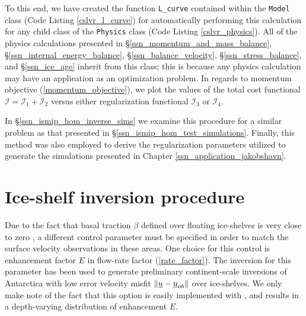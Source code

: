 To this end, we have created the function \texttt{L\_curve} contained within the \texttt{Model} class (Code Listing \ref{cslvr_l_curve}) for automatically performing this calculation for any child class of the \CSLVR \texttt{Physics} class (Code Listing \ref{cslvr_physics}).  All of the physics calculations presented in \S \ref{ssn_momentum_and_mass_balance}, \S \ref{ssn_internal_energy_balance}, \S \ref{ssn_balance_velocity}, \S \ref{ssn_stress_balance}, and \S \ref{ssn_ice_age} inherit from this class; this is because any physics calculation may have an application as an optimization problem.  In regards to momentum objective (\ref{momentum_objective}), we plot the values of the total cost functional $\mathscr{I} = \mathscr{I}_1 + \mathscr{I}_2$ versus either regularization functional $\mathscr{I}_3$ or $\mathscr{I}_4$.

In \S \ref{ssn_ismip_hom_inverse_sims} we examine this procedure for a similar problem as that presented in \S \ref{ssn_ismip_hom_test_simulations}.  Finally, this method was also employed to derive the regularization parameters utilized to generate the simulations presented in Chapter \ref{ssn_application_jakobshavn}.



\section{Ice-shelf inversion procedure} \label{ssn_shelf_inversion}

Due to the fact that basal traction $\beta$ defined over floating ice-shelves is very close to zero \citep{greve_2009}, a different control parameter must be specified in order to match the surface velocity observations in these areas.  One choice for this control is enhancement factor $E$ in flow-rate factor (\ref{rate_factor}).  The inversion for this parameter has been used to generate preliminary continent-scale inversions of Antarctica with low error velocity misfit $\Vert \underline{u} - \underline{u}_{ob} \Vert$ over ice-shelves.  We only make note of the fact that this option is easily implemented with \CSLVR, and results in a depth-varying distribution of enhancement $E$.

